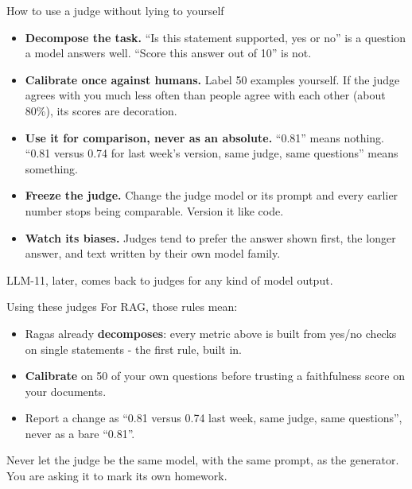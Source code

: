 \documentclass[aspectratio=169]{beamer}
\newcommand{\trapbox}[1]{%
  \begin{tcolorbox}[colback=armred!8, colframe=armred, boxrule=0.6pt, arc=2pt]
  #1
  \end{tcolorbox}}
\begin{document}
\begin{frame}{How to use a judge without lying to yourself}
  \vskip 4pt
  \begin{itemize}
    \item \textbf{Decompose the task.} ``Is this statement supported, yes or no'' is a question a
      model answers well. ``Score this answer out of 10'' is not.
    \item \textbf{Calibrate once against humans.} Label 50 examples yourself. If the judge agrees
      with you much less often than people agree with each other (about 80\%), its scores are
      decoration.
    \item \textbf{Use it for comparison, never as an absolute.} ``0.81'' means nothing. ``0.81
      versus 0.74 for last week's version, same judge, same questions'' means something.
    \item \textbf{Freeze the judge.} Change the judge model or its prompt and every earlier number
      stops being comparable. Version it like code.
    \item \textbf{Watch its biases.} Judges tend to prefer the answer shown first, the longer
      answer, and text written by their own model family.
  \end{itemize}

  \vskip 6pt
  {\small\color{gray}LLM-11, later, comes back to judges for any kind of model output.}
\end{frame}

\begin{frame}{Using these judges}
  \vspace{0.7em}
  For RAG, those rules mean:

  \vspace{0.6em}
  \begin{itemize}
    \item Ragas already \textbf{decomposes}: every metric above is built from yes/no checks on
      single statements - the first rule, built in.
    \item \textbf{Calibrate} on 50 of your own questions before trusting a faithfulness score on
      your documents.
    \item Report a change as ``0.81 versus 0.74 last week, same judge, same questions'', never as
      a bare ``0.81''.
  \end{itemize}

  \vspace{0.7em}
  \trapbox{Never let the judge be the same model, with the same prompt, as the generator. You are
  asking it to mark its own homework.}
\end{frame}
\end{document}
